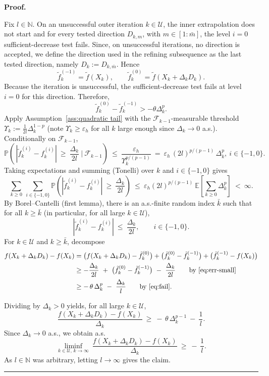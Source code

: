 \documentclass[11pt,a4paper]{article}
\newenvironment{proof}[1][Proof]{%
  \par\noindent\textbf{#1.}\ %
}{%
  \par\vspace{-0.5 ex}            %
  \noindent\hfill\rule{0.5em}{0.5em}\par
  \vspace{1ex}
}
\newcommand{\F}{\mathcal{F}}
\newcommand{\Pb}{\mathbb{P}}
\newcommand{\Dexp}{p}
\newcommand{\aexp}{\Dexp/(\Dexp-1)}
\newcommand{\EE}{\mathbb{E}}
\begin{document}
\begin{proof}
Fix $l\in\mathbb N$. On an unsuccessful outer iteration $k\in \mathcal{U}$, the inner extrapolation does not
start and for every tested direction $D_{k,m}$, with $m\in[1:\bar{m}]$, the level $i=0$ sufficient-decrease
test fails. Since, on unsuccessful iterations, no direction is accepted, we define the
direction used in the refining subsequence as the last tested direction,
namely $D_k:=D_{k,\bar{m}}$. Hence
$$
\tilde f_k^{(-1)}=\tilde f(X_k),
\qquad
\tilde f_k^{(0)}=\tilde f(X_k+\Delta_kD_k).
$$
Because the iteration is unsuccessful, the sufficient-decrease test fails at
level $i=0$ for this direction. Therefore,
\begin{equation}\label{eq:fail}
\tilde f_k^{(0)}-\tilde f_k^{(-1)}
>
-\theta\Delta_k^{\Dexp}.
\end{equation}
Apply Assumption~\ref{ass:quadratic tail} with the $\F_{k-1}$-measurable threshold
$\Upsilon_k:=\frac{1}{2l}\Delta_k^{1-\Dexp}$ (note $\Upsilon_k\ge \varepsilon_h$ for all $k$ large enough since
$\Delta_k\to 0$ a.s.). Conditionally on $\F_{k-1}$,
\[
\Pb\!\left(\,|\tilde f_k^{(i)}-f_k^{(i)}|\ \ge\ \frac{\Delta_k}{2l}\ \Big|\ \F_{k-1}\right)
\ \le\ \frac{\varepsilon_h}{\Upsilon_k^{\aexp}}
\ =\ \varepsilon_h\,(2l)^{\aexp}\,\Delta_k^{\Dexp},
\  i\in\{-1,0\}.
\]
Taking expectations and summing (Tonelli) over $k$ and $i\in\{-1,0\}$ gives
\[
\sum_{k\ge 0}\ \sum_{i\in\{-1,0\}}\Pb\!\left(|\tilde f_k^{(i)}-f_k^{(i)}|\ \ge\ \frac{\Delta_k}{2l}\right)
\ \le\ \varepsilon_h (2l)^{\aexp}\ \EE\!\left[\sum_{k\ge 0}\Delta_k^{\Dexp}\right]\ <\ \infty.
\]
By Borel--Cantelli (first lemma), there is an a.s.-finite random index $\bar{k}$ such that for all
$k\ge \bar{k}$ (in particular, for all large $k\in \mathcal{U}$),
\begin{equation}\label{eq:err-small}
|\tilde f_k^{(i)}-f_k^{(i)}|\ \le\ \frac{\Delta_k}{2l},\qquad i\in\{-1,0\}.
\end{equation}
For $k\in \mathcal{U}$ and $k\ge \bar{k}$, decompose
\begin{align*}
f(X_k+\Delta_k D_k)-f(X_k)
&=\big(f(X_k+\Delta_k D_k)-\tilde f_k^{(0)}\big)
 +\big(\tilde f_k^{(0)}-\tilde f_k^{(-1)}\big)
 +\big(\tilde f_k^{(-1)}-f(X_k)\big) \\
&\ge -\frac{\Delta_k}{2l}\ +\ \big(\tilde f_k^{(0)}-\tilde f_k^{(-1)}\big)\ -\ \frac{\Delta_k}{2l}
\qquad\text{by \eqref{eq:err-small}} \\
&\ge -\,\theta\,\Delta_k^{\Dexp}\ -\ \frac{\Delta_k}{l}
\qquad\text{by \eqref{eq:fail}}.
\end{align*}


Dividing by $\Delta_k>0$ yields, for all large $k\in \mathcal{U}$,
\[
\frac{f(X_k+\Delta_k D_k)-f(X_k)}{\Delta_k}\ \ge\ -\,\theta\,\Delta_k^{\Dexp-1}\ -\ \frac{1}{l}.
\]
Since $\Delta_k\to 0$ a.s., we obtain a.s.
\[
\liminf_{k\in \mathcal{U},\,k\to\infty}\ \frac{f(X_k+\Delta_k D_k)-f(X_k)}{\Delta_k}
\ \ge\ -\,\frac{1}{l}.
\]
As $l\in\mathbb N$ was arbitrary, letting $l\to\infty$ gives the claim.
\end{proof}
\end{document}
